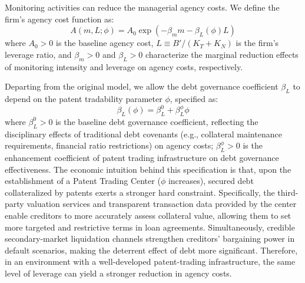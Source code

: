 \documentclass[12pt,a4paper]{article}
\begin{document}
Monitoring activities can reduce the managerial agency costs. We define the firm's agency cost function as:
\begin{equation}
A(m, L; \phi) = A_0 \exp(-\beta_m m - \beta_L(\phi)L)
\end{equation}
where $A_0 > 0$ is the baseline agency cost, $L \equiv B'/(K_T + K_N)$ is the firm's leverage ratio, and $\beta_m > 0$ and $\beta_L > 0$ characterize the marginal reduction effects of monitoring intensity and leverage on agency costs, respectively.

Departing from the original model, we allow the debt governance coefficient $\beta_L$ to depend on the patent tradability parameter $\phi$, specified as:
\begin{equation}
\beta_L(\phi) = \beta_L^0 + \beta_L^\phi \phi
\end{equation}
where $\beta_L^0 > 0$ is the baseline debt governance coefficient, reflecting the disciplinary effects of traditional debt covenants (e.g., collateral maintenance requirements, financial ratio restrictions) on agency costs; $\beta_L^\phi > 0$ is the enhancement coefficient of patent trading infrastructure on debt governance effectiveness. The economic intuition behind this specification is that, upon the establishment of a Patent Trading Center ($\phi$ increases), secured debt collateralized by patents exerts a stronger hard constraint. Specifically, the third-party valuation services and transparent transaction data provided by the center enable creditors to more accurately assess collateral value, allowing them to set more targeted and restrictive terms in loan agreements. Simultaneously, credible secondary-market liquidation channels strengthen creditors' bargaining power in default scenarios, making the deterrent effect of debt more significant. Therefore, in an environment with a well-developed patent-trading infrastructure, the same level of leverage can yield a stronger reduction in agency costs.
\end{document}
